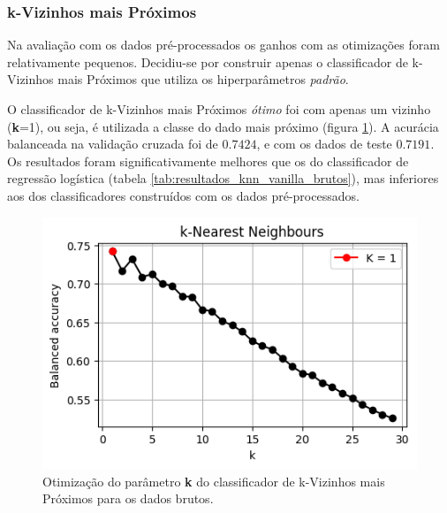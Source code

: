 \documentclass[final,5p]{elsarticle}
\numberwithin{equation}{section}
\begin{document}
    \subsubsection{k-Vizinhos mais Próximos}

        Na avaliação com os dados pré-processados os ganhos com as otimizações foram relativamente pequenos. Decidiu-se por construir apenas o classificador de k-Vizinhos mais Próximos que utiliza os hiperparâmetros \emph{padrão}.

        O classificador de k-Vizinhos mais Próximos \emph{ótimo} foi com apenas um vizinho (\textbf{k}=1), ou seja, é utilizada a classe do dado mais próximo (figura \ref{fig:knn_melhor_k_brutos}). A acurácia balanceada na validação cruzada foi de $0.7424$, e com os dados de teste $0.7191$. Os resultados foram significativamente melhores que os do classificador de regressão logística (tabela \ref{tab:resultados_knn_vanilla_brutos}), mas inferiores aos dos classificadores construídos com os dados pré-processados.

        \begin{figure}[hbt!]
            \includegraphics[width=0.95\columnwidth]{B_kNN_bestK.png}
            \caption{Otimização do parâmetro \textbf{k} do classificador de k-Vizinhos mais Próximos para os dados brutos.}
            \label{fig:knn_melhor_k_brutos}
        \end{figure}
\end{document}
